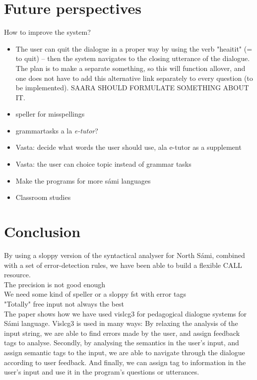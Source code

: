 \documentclass[11pt]{article}
\begin{document}
 

\section{Future perspectives}
How to improve the system?
\begin{itemize}
\setlength{\itemsep}{-0.2cm}
\item The user can quit the dialogue in a proper way by using the verb "heaitit" (= to quit) -- then the system navigates to the closing utterance of the dialogue. The plan is to make a separate something, so this will function allover, and one does not have to add this alternative link separately to every question (to be implemented). SAARA SHOULD FORMULATE SOMETHING ABOUT IT. 
\item  speller for misspellings
\item  grammartasks a la \textit{e-tutor}?
\item  Vasta: decide what words the user should use, ala e-tutor \cite{Heift:01,Heift:02} as a supplement
\item  Vasta: the user can choice topic instead of grammar tasks
\item  Make the programs for more sámi languages
\item  Classroom studies 
\end{itemize}

\section{Conclusion}

By using a sloppy version of the syntactical analyser for North Sámi, combined with a set of error-detection rules, we have been able to build a flexible CALL resource. \\ 
The precision is not good enough  \\
We need some kind of speller or a sloppy fst with error tags \\
"Totally" free input not always the best \\




The paper shows how we have used vislcg3 for pedagogical dialogue systems for Sámi language. Vislcg3 is used in many ways: By relaxing the analysis of the input string, we are able to find errors made by the user, and assign feedback tags to analyse. Secondly, by analysing the semantics in the user's input, and assign semantic tags to the input, we are able to navigate through the dialogue according to user feedback. And finally, we can assign tag to information in the user's input and use it in the program's questions or utterances.  
\end{document}

